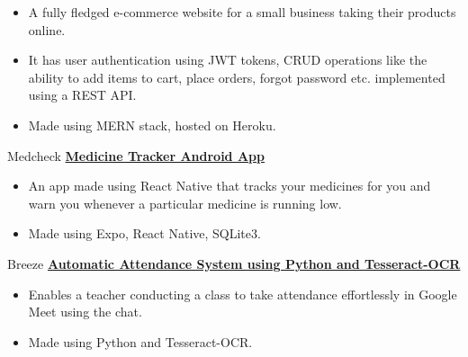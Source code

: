 {
    \begin{itemize}
        \item A fully fledged e-commerce website for a small business taking their products online.
        \item It has user authentication using JWT tokens, CRUD operations like the ability to add items to cart, place orders, forgot password etc. implemented using a REST API.
        \item Made using MERN stack, hosted on Heroku.
    \end{itemize}
}
{Medcheck}
{\href{https://github.com/confumbit/medcheck}{\textbf{Medicine Tracker Android App}}}
{
    \begin{itemize}
        \item An app made using React Native that tracks your medicines for you and warn you whenever a particular medicine is running low.
        \item Made using Expo, React Native, SQLite3.
    \end{itemize}
}
{Breeze}
{\href{https://github.com/confumbit/Breeze}{\textbf{Automatic Attendance System using Python and
            Tesseract-OCR}}}
{
    \begin{itemize}
        \item Enables a teacher conducting a class to take attendance effortlessly in Google Meet using the chat.
        \item Made using Python and Tesseract-OCR.
    \end{itemize}
}